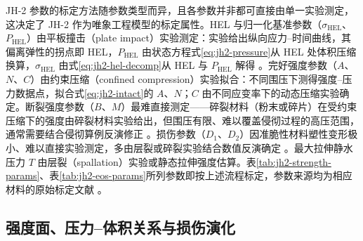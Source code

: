 JH-2 参数的标定方法随参数类型而异，且各参数并非都可直接由单一实验测定，这决定了 JH-2 作为唯象工程模型的标定属性。HEL 与归一化基准参数（$\sigma_{\mathrm{HEL}}$、$P_{\mathrm{HEL}}$）由平板撞击（plate impact）实验测定：实验给出纵向应力--时间曲线，其偏离弹性的拐点即 HEL，$P_{\mathrm{HEL}}$ 由状态方程式\eqref{eq:jh2-pressure}从 HEL 处体积压缩换算，$\sigma_{\mathrm{HEL}}$ 由式\eqref{eq:jh2-hel-decomp}从 HEL 与 $P_{\mathrm{HEL}}$ 解得 \cite{JohnsonHolmquist1999,HolmquistTempletonBishnoi2001}。完好强度参数（$A$、$N$、$C$）由约束压缩（confined compression）实验拟合：不同围压下测得强度--压力数据点，拟合式\eqref{eq:jh2-intact}的 $A$、$N$；$C$ 由不同应变率下的动态压缩实验确定。断裂强度参数（$B$、$M$）最难直接测定——碎裂材料（粉末或碎片）在受约束压缩下的强度由碎裂材料实验给出，但围压有限、难以覆盖侵彻过程的高压范围，通常需要结合侵彻算例反演修正 \cite{JohnsonHolmquist1999,HolmquistJohnson2002}。损伤参数（$D_{1}$、$D_{2}$）因准脆性材料塑性变形极小、难以直接实验测定，多由层裂或碎裂实验结合数值反演确定 \cite{HolmquistTempletonBishnoi2001}。最大拉伸静水压力 $T$ 由层裂（spallation）实验或静态拉伸强度估算。表\ref{tab:jh2-strength-params}、表\ref{tab:jh2-eos-params}所列参数即按上述流程标定，参数来源均为相应材料的原始标定文献 \cite{JohnsonHolmquist1999,HolmquistJohnson2002,HolmquistTempletonBishnoi2001}。

\subsection{强度面、压力--体积关系与损伤演化}\label{sec:jh2-strength}

